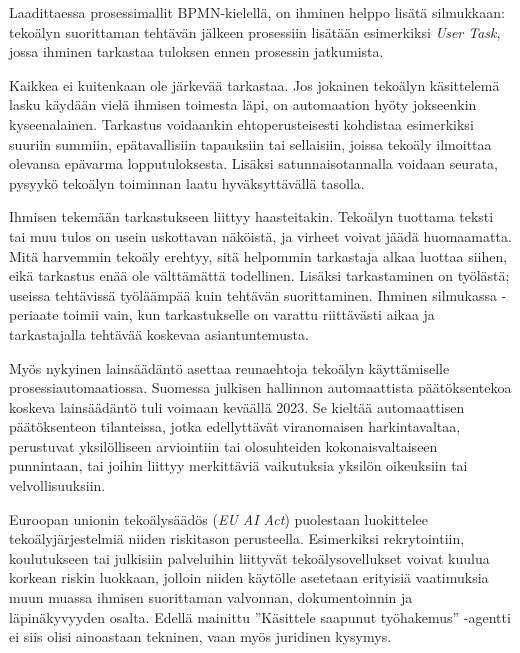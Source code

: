 \documentclass[
  finnish,
  letterpaper,
  DIV=11,
  numbers=noendperiod,
  oneside]{scrreprt}
\begin{document}
Laadittaessa prosessimallit BPMN-kielellä, on ihminen helppo lisätä
silmukkaan: tekoälyn suorittaman tehtävän jälkeen prosessiin lisätään
esimerkiksi \emph{User Task}, jossa ihminen tarkastaa tuloksen ennen
prosessin jatkumista.

Kaikkea ei kuitenkaan ole järkevää tarkastaa. Jos jokainen tekoälyn
käsittelemä lasku käydään vielä ihmisen toimesta läpi, on automaation
hyöty jokseenkin kyseenalainen. Tarkastus voidaankin ehtoperusteisesti
kohdistaa esimerkiksi suuriin summiin, epätavallisiin tapauksiin tai
sellaisiin, joissa tekoäly ilmoittaa olevansa epävarma lopputuloksesta.
Lisäksi satunnaisotannalla voidaan seurata, pysyykö tekoälyn toiminnan
laatu hyväksyttävällä tasolla.

Ihmisen tekemään tarkastukseen liittyy haasteitakin. Tekoälyn tuottama
teksti tai muu tulos on usein uskottavan näköistä, ja virheet voivat
jäädä huomaamatta. Mitä harvemmin tekoäly erehtyy, sitä helpommin
tarkastaja alkaa luottaa siihen, eikä tarkastus enää ole välttämättä
todellinen. Lisäksi tarkastaminen on työlästä; useissa tehtävissä
työläämpää kuin tehtävän suorittaminen. Ihminen silmukassa -periaate
toimii vain, kun tarkastukselle on varattu riittävästi aikaa ja
tarkastajalla tehtävää koskevaa asiantuntemusta.

Myös nykyinen lainsäädäntö asettaa reunaehtoja tekoälyn käyttämiselle
prosessiautomaatiossa. Suomessa julkisen hallinnon automaattista
päätöksentekoa koskeva lainsäädäntö tuli voimaan keväällä
2023. Se kieltää
automaattisen päätöksenteon tilanteissa, jotka edellyttävät viranomaisen
harkintavaltaa, perustuvat yksilölliseen arviointiin tai olosuhteiden
kokonaisvaltaiseen punnintaan, tai joihin liittyy merkittäviä
vaikutuksia yksilön oikeuksiin tai velvollisuuksiin.

Euroopan unionin tekoälysäädös (\emph{EU AI Act})
puolestaan luokittelee tekoälyjärjestelmiä niiden riskitason
perusteella. Esimerkiksi rekrytointiin, koulutukseen tai julkisiin
palveluihin liittyvät tekoälysovellukset voivat kuulua korkean riskin
luokkaan, jolloin niiden käytölle asetetaan erityisiä vaatimuksia muun
muassa ihmisen suorittaman valvonnan, dokumentoinnin ja läpinäkyvyyden
osalta. Edellä mainittu ''Käsittele saapunut työhakemus'' -agentti ei
siis olisi ainoastaan tekninen, vaan myös juridinen kysymys.
\end{document}
